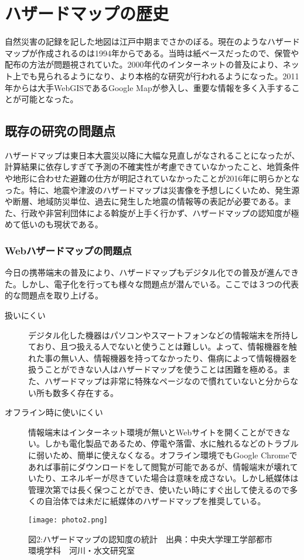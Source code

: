 \documentclass[report]{jsbook}
\begin{document}
\section{ハザードマップの歴史}
自然災害の記録を記した地図は江戸中期までさかのぼる。現在のようなハザードマップが作成されるのは1994年からである。当時は紙ベースだったので、保管や配布の方法が問題視されていた。2000年代のインターネットの普及により、ネット上でも見られるようになり、より本格的な研究が行われるようになった。2011年からは大手WebGISであるGoogle Mapが参入し、重要な情報を多く入手することが可能となった。 
\subsection{既存の研究の問題点}
ハザードマップは東日本大震災以降に大幅な見直しがなされることになったが、計算結果に依存しすぎて予測の不確実性が考慮できていなかったこと、地質条件や地形に合わせた避難の仕方が明記されていなかったことが2016年に明らかとなった。特に、地震や津波のハザードマップは災害像を予想しにくいため、発生源や断層、地域防災単位、過去に発生した地震の情報等の表記が必要である。また、行政や非営利団体による斡旋が上手く行かず、ハザードマップの認知度が極めて低いのも現状である。
\subsubsection{Webハザードマップの問題点}
今日の携帯端末の普及により、ハザードマップもデジタル化での普及が進んできた。しかし、電子化を行っても様々な問題点が潜んでいる。ここでは３つの代表的な問題点を取り上げる。
\begin{description}
\item[扱いにくい]デジタル化した機器はパソコンやスマートフォンなどの情報端末を所持しており、且つ扱える人でないと使うことは難しい。よって、情報機器を触れた事の無い人、情報機器を持ってなかったり、傷病によって情報機器を扱うことができない人はハザードマップを使うことは困難を極める。また、ハザードマップは非常に特殊なページなので慣れていないと分からない所も数多く存在する。
\item[オフライン時に使いにくい]情報端末はインターネット環境が無いとWebサイトを開くことができない。しかも電化製品であるため、停電や落雷、水に触れるなどのトラブルに弱いため、簡単に使えなくなる。オフライン環境でもGoogle Chromeであれば事前にダウンロードをして閲覧が可能であるが、情報端末が壊れていたり、エネルギーが尽きていた場合は意味を成さない。しかし紙媒体は管理次第では長く保つことができ、使いたい時にすぐ出して使えるので多くの自治体では未だに紙媒体のハザードマップを推奨している。
  \end{description}
\begin{center}
   \begin{figure}[htp]
    \texttt{[image: photo2.png]}
    \caption{図2:ハザードマップの認知度の統計　出典：中央大学理工学部都市環境学科　河川・水文研究室}
   \end{figure}
\end{center}
\end{document}

